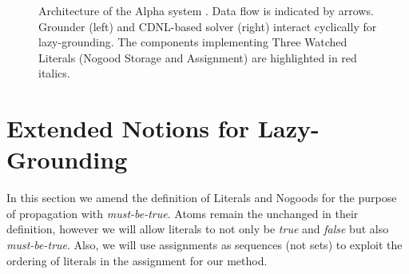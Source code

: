 \documentclass{vutinfth} %
\newtheorem{definition}{Definition}[chapter]
\newcommand{\mbt}{must-be-true\xspace}
\begin{document}
\begin{figure}[t]
\caption[Architecture of the Alpha system]{Architecture of the Alpha system \cite[Figure 1]{alpha-techniques}. Data flow is indicated by arrows. Grounder (left) and CDNL-based solver (right) interact cyclically for lazy-grounding. The components implementing Three Watched Literals (Nogood Storage and Assignment) are highlighted in red italics.}
  \label{fig:arch}
\end{figure}

\section{Extended Notions for Lazy-Grounding}


In this section we amend the definition of Literals and Nogoods for the purpose of propagation with \emph{\mbt}. Atoms remain the unchanged in their definition, however we will allow literals to not only be \emph{true} and \emph{false} but also \emph{\mbt}. Also, we will use assignments as sequences (not sets) to exploit the ordering of literals in the assignment for our method.



\end{document}
